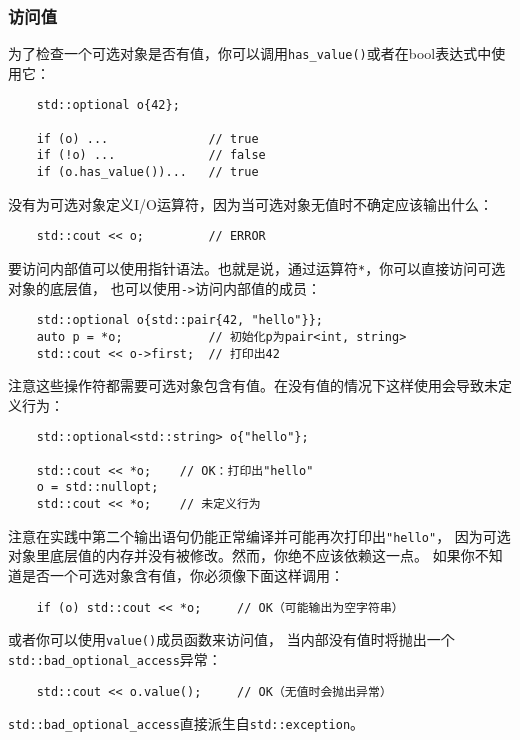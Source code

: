 \subsubsection{访问值}
为了检查一个可选对象是否有值，你可以调用\texttt{has\_value()}或者在bool表达式中使用它：
\begin{lstlisting}
    std::optional o{42};

    if (o) ...              // true
    if (!o) ...             // false
    if (o.has_value())...   // true
\end{lstlisting}
没有为可选对象定义I/O运算符，因为当可选对象无值时不确定应该输出什么：
\begin{lstlisting}
    std::cout << o;         // ERROR
\end{lstlisting}
要访问内部值可以使用指针语法。也就是说，通过运算符\texttt{*}，你可以直接访问可选对象的底层值，
也可以使用\texttt{->}访问内部值的成员：
\begin{lstlisting}
    std::optional o{std::pair{42, "hello"}};
    auto p = *o;            // 初始化p为pair<int, string>
    std::cout << o->first;  // 打印出42
\end{lstlisting}
注意这些操作符都需要可选对象包含有值。在没有值的情况下这样使用会导致未定义行为：
\begin{lstlisting}
    std::optional<std::string> o{"hello"};

    std::cout << *o;    // OK：打印出"hello"
    o = std::nullopt;
    std::cout << *o;    // 未定义行为
\end{lstlisting}
注意在实践中第二个输出语句仍能正常编译并可能再次打印出\texttt{"hello"}，
因为可选对象里底层值的内存并没有被修改。然而，你绝不应该依赖这一点。
如果你不知道是否一个可选对象含有值，你必须像下面这样调用：
\begin{lstlisting}
    if (o) std::cout << *o;     // OK（可能输出为空字符串）
\end{lstlisting}
或者你可以使用\texttt{value()}成员函数来访问值，
当内部没有值时将抛出一个\texttt{std::bad\_optional\_access}异常：
\begin{lstlisting}
    std::cout << o.value();     // OK（无值时会抛出异常）
\end{lstlisting}
\texttt{std::bad\_optional\_access}直接派生自\texttt{std::exception}。

